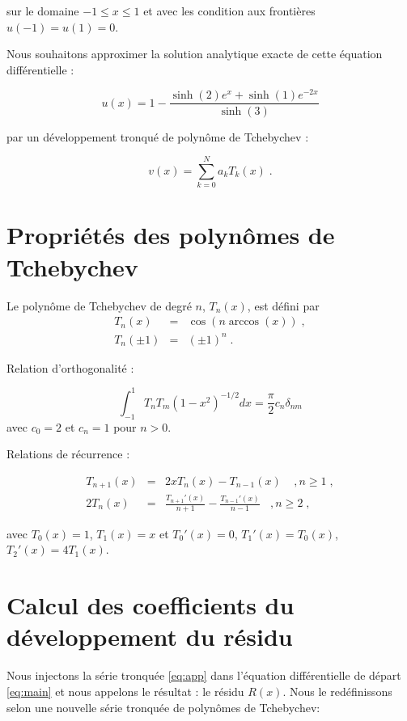 \documentclass{report}
\begin{document}
sur le domaine $-1\leq x \leq 1$ et avec les condition aux frontières $u(-1)=u(1)=0$.

Nous souhaitons approximer la solution analytique exacte de cette équation différentielle :

\begin{equation}
u(x) = 1- \frac{\sinh(2)e^{x}+\sinh(1)e^{-2x}}{\sinh(3)}
\end{equation}

par un développement tronqué de polynôme de Tchebychev :

\begin{equation}\label{eq:app}
v(x) = \sum_{k=0}^N a_k T_k(x) \;.
\end{equation}

\section{Propriétés des polynômes de Tchebychev}

Le polynôme de Tchebychev de degré $n$, $T_n(x)$, est défini par
\begin{eqnarray}
T_n(x) &=& \cos (n\arccos(x))\;, \label{T_def}\\
T_n(\pm1) &=& (\pm1)^n\;.\label{eq+-1}
\end{eqnarray}

Relation d'orthogonalité :

\begin{equation}\label{ortho}
\int_{-1}^{1} T_n T_m (1-x^2)^{-1/2} dx = \frac{\pi}{2} c_n \delta_{nm}
\end{equation}
avec $c_0=2$ et $c_n = 1$ pour $n>0$.

Relations de récurrence :

\begin{eqnarray}
T_{n+1}(x) & = & 2xT_n(x) - T_{n-1}(x) \ \ \ \ \ , n \geq 1\;,\\
2T_n (x) & = & \frac{T_{n+1}'(x)}{n+1} - \frac{T_{n-1}'(x)}{n-1} \ \ \ \ , n \geq 2\;,\label{eq:rec}
\end{eqnarray}

avec $T_0 (x) = 1$, $T_1 (x) = x$ et $T_0' (x) = 0$, $T_1' (x) = T_0 (x)$, $T_2' (x) = 4T_1 (x)$.

\section{Calcul des coefficients du développement du résidu}

Nous injectons la série tronquée \eqref{eq:app} dans l'équation différentielle de départ \eqref{eq:main} et nous appelons le résultat : le résidu $R(x)$. Nous le redéfinissons selon une nouvelle série tronquée de polynômes de Tchebychev:
\end{document}
